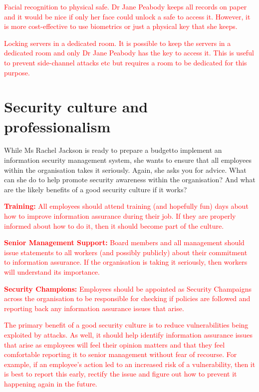 \documentclass{llncs}
\begin{document}
\textcolor{red}{Facial recognition to physical safe. Dr Jane Peabody keeps all records on paper and it would be nice if only her face could unlock a safe to access it. However, it is more cost-effective to use biometrics or just a physical key that she keeps.}

\textcolor{red}{Locking servers in a dedicated room. It is possible to keep the servers in a dedicated room and only Dr Jane Peabody has the key to access it. This is useful to prevent side-channel attacks etc but requires a room to be dedicated for this purpose. }

\section{Security culture and professionalism} 
While Ms Rachel Jackson is ready to prepare a budgetto implement an information security management system, she wants to ensure that all employees within the organisation takes it seriously. 
Again, she asks you for advice. 
What can she do to help promote security awareness within the organisation? And what are the likely benefits of a good security culture if it works? 

\textcolor{Red}{\textbf{Training: } All employees should attend training (and hopefully fun) days about how to improve information assurance during their job. If they are properly informed about how to do it, then it should become part of the culture. }

\textcolor{Red}{\textbf{Senior Management Support: } Board members and all management should issue statements to all workers (and possibly publicly) about their commitment to information assurance. If the organisation is taking it seriously, then workers will understand its importance. }

\textcolor{Red}{\textbf{Security Champions: } Employees should be appointed as Security Champaigns across the organisation to be responsible for checking if policies are followed and reporting back any information assurance issues that arise. }

\textcolor{red}{The primary benefit of a good security culture is to reduce vulnerabilities being exploited by attacks. 
As well, it should help identify information assurance issues that arise as employees will feel their opinion matters and that they feel comfortable reporting it to senior management without fear of recourse. 
For example, if an employee's action led to an increased risk of a vulnerability, then it is best to report this early, rectify the issue and figure out how to prevent it happening again in the future.} 
\end{document}
